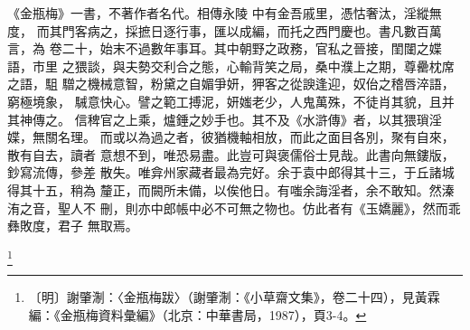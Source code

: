 \begin{showcontents}{}
《金瓶梅》一書，不著作者名代。相傳永陵
中有金吾戚里，憑怙奢汰，淫縱無度，
而其門客病之，採摭日逐行事，匯以成編，而托之西門慶也。書凡數百萬言，為
卷二十，始末不過數年事耳。其中朝野之政務，官私之晉接，閨闥之媟語，市里
之猥談，與夫勢交利合之態，心輸背笑之局，桑中濮上之期，尊罍枕席之語，駔
驓之機械意智，粉黛之自媚爭妍，狎客之從諛逢迎，奴佁之稽唇淬語，窮極境象，
駴意快心。譬之範工搏泥，妍媸老少，人鬼萬殊，不徒肖其貌，且并其神傳之。
信稗官之上乘，爐錘之妙手也。其不及《水滸傳》者，以其猥瑣淫媟，無關名理。
而或以為過之者，彼猶機軸相放，而此之面目各別，聚有自來，散有自去，讀者
意想不到，唯恐易盡。此豈可與褒儒俗士見哉。此書向無鏤版，鈔寫流傳，參差
散失。唯弇州家藏者最為完好。余于袁中郎得其十三，于丘諸城得其十五，稍為
釐正，而闕所未備，以俟他日。有嗤余誨淫者，余不敢知。然溱洧之音，聖人不
刪，則亦中郎帳中必不可無之物也。仿此者有《玉嬌麗》，然而乖彝敗度，君子
無取焉。



\footnote{〔明〕謝肇淛：〈金瓶梅跋〉（謝肇淛：《小草齋文集》，卷二十四），見黃霖編：《金瓶梅資料彙編》（北京：中華書局，1987），頁3-4。}






\end{showcontents}
